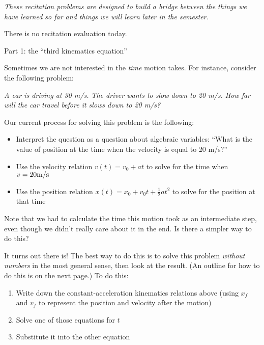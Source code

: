 \documentclass[12pt]{article}
\newcommand{\BI}{\begin{itemize}}
\newcommand{\EI}{\end{itemize}}
\begin{document}
\Large
\centerline{}
\normalsize
\centerline{}

\it These recitation problems are designed to build a bridge between the things we have learned so far and things we will learn later in the semester.

\rm

There is no recitation evaluation today.



\begin{center}
\Large
Part 1: the ``third kinematics equation''
\end{center}

Sometimes we are not interested in the {\it time} motion takes. For instance, consider the following problem:

\begin{center}
	\it A car is driving at 30 m/s. The driver wants to slow down to 20 m/s. How far will the car travel before it slows down to 20 m/s?
\end{center}

Our current process for solving this problem is the following:

\BI
\item Interpret the question as a question about algebraic variables: ``What is the value of position at the time when the velocity is equal to 20 m/s?''
\item Use the velocity relation $v(t) = v_0 + at$ to solve for the time when $v = 20 \rm m/\rm s$
\item Use the position relation $x(t) = x_0 + v_0 t + \frac{1}{2}at^2$ to solve for the position at that time
\EI

Note that we had to calculate the time this motion took as an intermediate step, even though we didn't really care about it in the end. Is there a simpler way to do this?

It turns out there is! The best way to do this is to solve this problem {\it without numbers} in the most general sense, then look at the result. (An outline for how to do this is on the next page.)
\newpage
To do this:

\begin{enumerate}
\item Write down the constant-acceleration kinematics relations above (using $x_f$ and $v_f$ to represent the position and velocity after the motion)
\item Solve one of those equations for $t$
\item Substitute it into the other equation
\end{enumerate}
\end{document}
